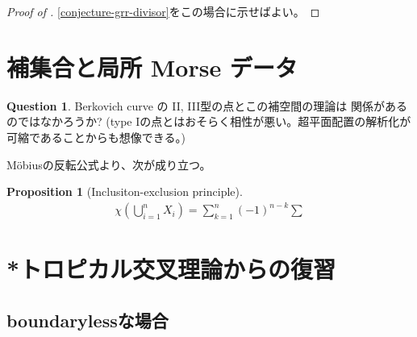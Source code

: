 \documentclass[a4paper,dvipdfmx,reqno,12pt]{amsart}
\theoremstyle{definition}
\newtheorem{proposition}[theorem]{Proposition}
\newtheorem{question}[theorem]{Question}
\numberwithin{equation}{section}
\begin{document}
\begin{proof}[{Proof of }]
\cref{conjecture-grr-divisor}をこの場合に示せばよい。  
\end{proof}

\section{補集合と局所 Morse データ}

\begin{question}
Berkovich curve の II, III型の点とこの補空間の理論は
関係があるのではなかろうか? 
(type Iの点とはおそらく相性が悪い。超平面配置の解析化が
可縮であることからも想像できる。)
\end{question}

M\"obiusの反転公式より、次が成り立つ。

\begin{proposition}[{Inclusiton-exclusion principle}]

\begin{align}
\chi(\bigcup_{i=1}^{n} X_i)=
\sum_{k=1}^{n}(-1)^{n-k}\sum 
\end{align}

\section{*トロピカル交叉理論からの復習}

\subsection{boundarylessな場合}


\end{proposition}












\end{document}
